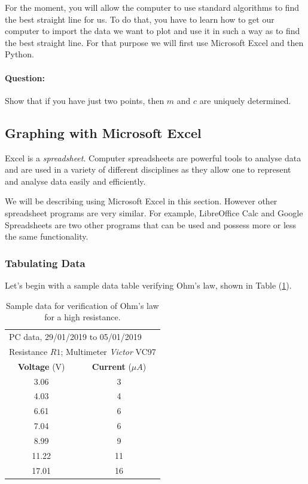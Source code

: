 For the moment, you will allow the computer to use standard algorithms to find the best straight line for us. To do that, you have to learn how to get our computer to import the data we want to plot and use it in such a way as to find the best straight line. For that purpose we will first use Microsoft Excel and then Python. 

\begin{question}
\paragraph{Question:} Show that if you have just two points, then $m$ and $c$ are uniquely determined. 
\end{question}


\subsection{Graphing with Microsoft Excel}

Excel is a \textit{spreadsheet}. Computer spreadsheets are powerful tools to analyse data and are used in a variety of different disciplines as they allow one to represent and analyse data easily and efficiently. 

\begin{tip}
We will be describing using Microsoft Excel in this section. However other spreadsheet programs are very similar. For example, LibreOffice Calc and Google Spreadsheets are two other programs that can be used and possess more or less the same functionality.
\end{tip}

\subsubsection{Tabulating Data}

Let's begin with a sample data table verifying Ohm's law, shown in Table (\ref{table:ohm}).

\begin{table}[!htb]
\centering
\begin{tabular}{|c|c|}
\hline
\rowcolor{orange!25}
\hline
\multicolumn{2}{|l|}{Experiment $n$: \textbf{Verification of Ohm's Law for high resistance}}\\
\hline
\multicolumn{2}{|l|}{PC data, 29/01/2019 to 05/01/2019}\\
\hline
\multicolumn{2}{|l|}{Resistance $R1$; Multimeter \textit{Victor} VC97}\\
\hline
\rowcolor{orange!50}
\textbf{Voltage} {\color{black}(V)} & \textbf{Current} {\color{black}($\mu A$)}\\
\hline
3.06 & 3\\
4.03 & 4\\
6.61 & 6\\
7.04 & 6\\
8.99 & 9\\
11.22& 11\\
17.01& 16\\
 \hline
\end{tabular}
\caption{Sample data for verification of Ohm’s law for a high resistance.}
\label{table:ohm}
\end{table}

